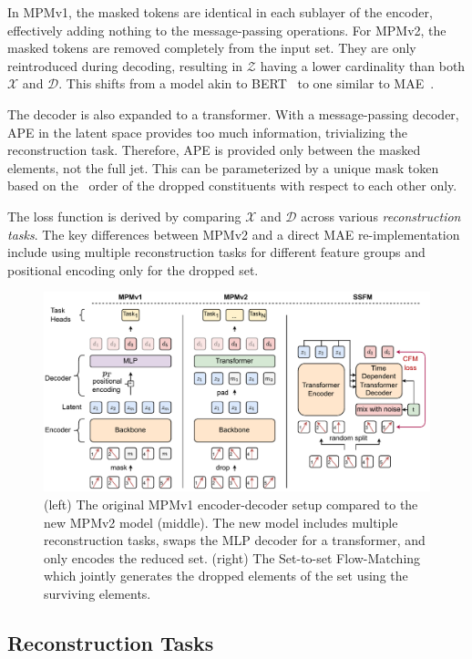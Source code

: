 In MPMv1, the masked tokens are identical in each sublayer of the encoder, effectively adding nothing to the message-passing operations.
For MPMv2, the masked tokens are removed completely from the input set.
They are only reintroduced during decoding, resulting in $\mathcal{Z}$ having a lower cardinality than both $\mathcal{X}$ and $\mathcal{D}$.
This shifts from a model akin to BERT~\cite{BERT} to one similar to MAE~\cite{MAE}.

The decoder is also expanded to a transformer.
With a message-passing decoder, APE in the latent space provides too much information, trivializing the reconstruction task.
Therefore, APE is provided only between the masked elements, not the full jet.
This can be parameterized by a unique mask token based on the \pt~order of the dropped constituents with respect to each other only.

The loss function is derived by comparing $\mathcal{X}$ and $\mathcal{D}$ across various \textit{reconstruction tasks}.
The key differences between MPMv2 and a direct MAE re-implementation include using multiple reconstruction tasks for different feature groups and positional encoding only for the dropped set.

\begin{figure}[t!]
    \centering
    \includegraphics[width=\textwidth]{Figures/foundation_models/mpm2/FlowBert.drawio.pdf}
    \caption{(left) The original MPMv1 encoder-decoder setup compared to the new MPMv2 model (middle). The new model includes multiple reconstruction tasks, swaps the MLP decoder for a transformer, and only encodes the reduced set. (right) The Set-to-set Flow-Matching which jointly generates the dropped elements of the set using the surviving elements.
        \label{fig:models}
    }
\end{figure}

\subsection{Reconstruction Tasks}
\label{sec:recovery}


